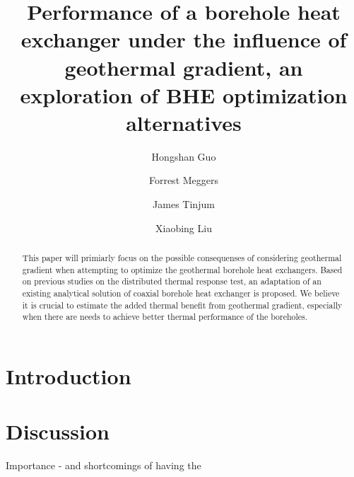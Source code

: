 \documentclass[3p]{elsarticle/elsarticle}
\begin{document}
\begin{frontmatter}
\title{Performance of a borehole heat exchanger under the influence of geothermal gradient, an exploration of BHE optimization alternatives}
\author[Group1]{Hongshan Guo}



\author[Group2]{Forrest Meggers}


\author[Group3]{James Tinjum}
\author[Group4]{Xiaobing Liu}

\address[Group1]{Andlinger Center for Energy and the Environment, Princeton University, Princeton, United States}
\address[Group2]{School of Architecture, Princeton University, Princeton, United States}



\begin{abstract}
This paper will primiarly focus on the possible consequenses of considering geothermal gradient when attempting to optimize the geothermal borehole heat exchangers. Based on previous studies on the distributed thermal response test, an adaptation of an existing analytical solution of coaxial borehole heat exchanger is proposed. We believe it is crucial to estimate the added thermal benefit from geothermal gradient, especially when there are needs to achieve better thermal performance of the boreholes.\end{abstract}

\begin{keyword}

\end{keyword}

\end{frontmatter}

\section{Introduction}



\section{Discussion}
Importance - and shortcomings of having the 

\renewcommand\refname{References}

\end{document}
